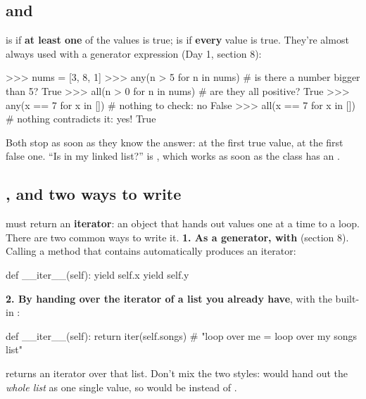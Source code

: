 \documentclass[10pt,a4paper]{article}
\begin{document}
\subsection{ and }
 is  if \textbf{at least one} of the values is true;  is  if \textbf{every} value is true. They’re almost always used with a generator expression (Day 1, section 8):
\begin{txtcode}
>>> nums = [3, 8, 1]
>>> any(n > 5 for n in nums)         # is there a number bigger than 5?
True
>>> all(n > 0 for n in nums)         # are they all positive?
True
>>> any(x == 7 for x in [])          # nothing to check: no
False
>>> all(x == 7 for x in [])          # nothing contradicts it: yes!
True
\end{txtcode}
Both stop as soon as they know the answer:  at the first true value,  at the first false one. “Is  in my linked list?” is , which works as soon as the class has an .
\subsection{, and two ways to write }
 must return an \textbf{iterator}: an object that hands out values one at a time to a  loop. There are two common ways to write it.
\textbf{1. As a generator, with } (section 8). Calling a method that contains  automatically produces an iterator:
\begin{pycode}
def __iter__(self):
    yield self.x
    yield self.y
\end{pycode}
\textbf{2. By handing over the iterator of a list you already have}, with the built-in :
\begin{pycode}
def __iter__(self):
    return iter(self.songs)     # "loop over me = loop over my songs list"
\end{pycode}
 returns an iterator over that list. Don’t mix the two styles:  would hand out the \emph{whole list} as one single value, so  would be \code{[['a',\allowbreak{}\ 'b']]} instead of \code{['a',\allowbreak{}\ 'b']}.
\end{document}
